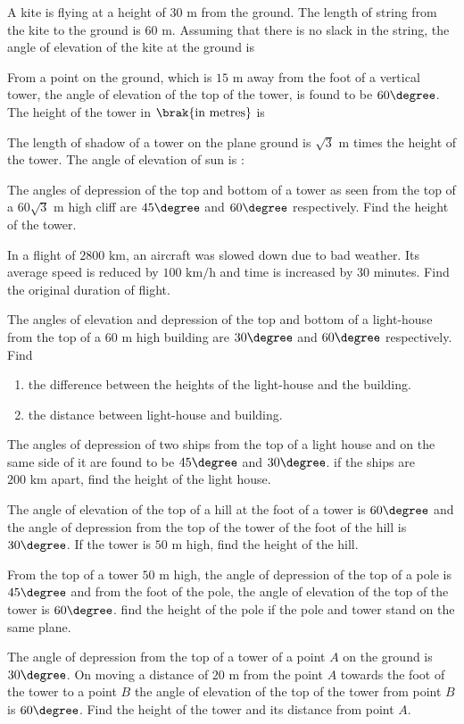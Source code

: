 \item A kite is flying at a height of $30 \text{ m}$ from the ground. The length of string from the kite to the ground is $60 \text{ m}$. Assuming that there is no slack in the string, the angle of elevation of the kite at the ground is 
\hfill{}\item From a point on the ground, which is $15\text{ m}$ away from the foot of a vertical tower, the angle of elevation of the top of the tower, is found to be $60\degree$. The height of the tower in $\brak{\text{in metres}}$ is 
\hfill{}\item The length of shadow of a tower on the plane ground is $\sqrt 3 \text{ m}$ times the height of the tower. The angle of elevation of sun is : 
\hfill{}\item The angles of depression of the top and bottom of a tower as seen from the top of a $60\sqrt 3 \text{ m}$ high cliff are $45\degree$ and $60\degree$ respectively. Find the height of the tower. 
\hfill{}\item In a flight of $2800 \text{ km}$, an aircraft was slowed down due to bad weather. Its average speed is reduced by $100 \text{ km/h}$ and time is increased by $30$ minutes. Find the original duration of flight. 
\hfill{}\item The angles of elevation and depression of the top and bottom of a light-house from the top of a $60 \text{ m}$ high building are $30\degree$ and $60\degree$ respectively. Find 
\begin{enumerate}[label=\Roman*.]
\hfill{}\item the difference between the heights of the light-house and the building. 
\hfill{}\item the distance between light-house and building. 
\end{enumerate}
\hfill{}\item The angles of depression of two ships from the top of a light house and on the same side of it are found to be $45\degree$ and $30\degree$. if the ships are $200 \text{ km}$ apart, find the height of the light house. 
\hfill{}\item The angle of elevation of the top of a hill at the foot of a tower is $60\degree$ and the angle of depression from the top of the tower of the foot of the hill is $30\degree$. If the tower is $50\text{ m}$ high, find the height of the hill. 
\hfill{}\item From the top of a tower $50\text{ m}$ high, the angle of depression of the top of a pole is $45\degree$ and from the foot of the pole, the angle of elevation of the top of the tower is $60\degree$. find the height of the pole if the pole and tower stand on the same plane. 
\hfill{}\item The angle of depression from the top of a tower of a point $A$ on the ground is $30\degree$. On moving a distance of $20\text{ m}$ from the point $A$ towards the foot of the tower to a point $B$ the angle of elevation of the top of the tower from point $B$ is $60\degree$. Find the height of the tower and its distance from point $A$.
\hfill{}

